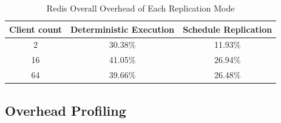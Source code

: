 \begin{table}
\caption{Redis Overall Overhead of Each Replication Mode}
\begin{center}
 \begin{tabular}{c | c | c}
Client count & Deterministic Execution & Schedule Replication \\ \hline
 2 & 30.38\% & 11.93\% \\ \hline
 16 & 41.05\% & 26.94\% \\ \hline
 64 & 39.66\% & 26.48\% \\ \hline
 \end{tabular}
\end{center}
\label{t:redis_overall}
\end{table}

\subsection{Overhead Profiling}
